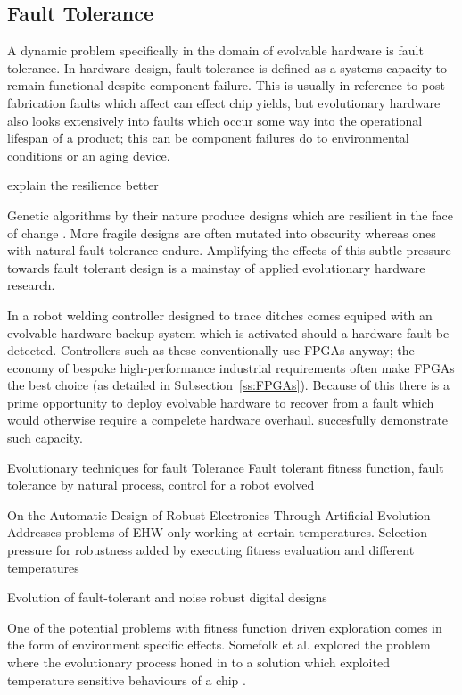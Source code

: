 \subsection{Fault Tolerance}

A dynamic problem specifically in the domain of evolvable hardware is fault
tolerance.
In hardware design, fault tolerance is defined as a systems capacity to
remain functional despite component failure. This is usually in reference to
post-fabrication faults which affect can effect chip yields, but evolutionary
hardware also looks extensively into faults which occur some way into the
operational lifespan of a product; this can be component failures do to environmental
conditions or an aging device.

\todo explain the resilience better

Genetic algorithms by their nature produce designs which are resilient in the face
of change \cite{10.1007/3-540-46406-9_14}. More fragile designs are often
mutated into obscurity whereas ones with
natural fault tolerance endure. Amplifying the effects of this subtle pressure towards fault
tolerant design is a mainstay of applied evolutionary hardware research.

In \cite{10.1007/3-540-61093-6_6} a robot welding controller designed to trace
ditches comes equiped with an evolvable hardware backup system which is activated
should a hardware fault be detected. Controllers such as these conventionally use
FPGAs anyway; the economy of bespoke high-performance industrial requirements
often make FPGAs the best choice (as detailed in Subsection~\ref{ss:FPGAs}). Because of
this there is a prime opportunity to deploy evolvable hardware to recover from
a fault which would otherwise require a compelete hardware overhaul. \cite{10.1007/3-540-61093-6_6}
succesfully demonstrate such capacity.

\todo Evolutionary techniques for fault Tolerance\cite{651463}
Fault tolerant fitness function, fault tolerance by natural process, control for a robot evolved

\todo On the Automatic Design of Robust Electronics Through Artificial Evolution
Addresses problems of EHW only working at certain temperatures. Selection pressure
for robustness added by executing fitness evaluation and different temperatures

\todo Evolution of fault-tolerant and noise robust digital designs

One of the potential problems with fitness function driven exploration comes in
the form of environment specific effects. Somefolk et al. explored the problem
where the evolutionary process honed in to a solution which exploited temperature
sensitive behaviours of a chip \cite{10.1007/BFb0057603}.

